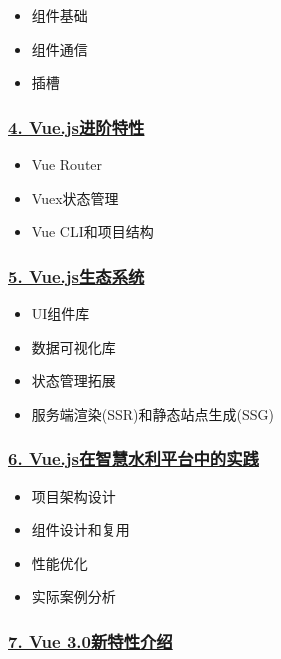 \begin{itemize}
\tightlist
\item
  组件基础
\item
  组件通信
\item
  插槽
\end{itemize}

\subsubsection{\texorpdfstring{\href{./section04-03-04.md}{4.
Vue.js进阶特性}}{4. Vue.js进阶特性}}\label{vue.jsux8fdbux9636ux7279ux6027}

\begin{itemize}
\tightlist
\item
  Vue Router
\item
  Vuex状态管理
\item
  Vue CLI和项目结构
\end{itemize}

\subsubsection{\texorpdfstring{\href{./section04-03-05.md}{5.
Vue.js生态系统}}{5. Vue.js生态系统}}\label{vue.jsux751fux6001ux7cfbux7edf}

\begin{itemize}
\tightlist
\item
  UI组件库
\item
  数据可视化库
\item
  状态管理拓展
\item
  服务端渲染(SSR)和静态站点生成(SSG)
\end{itemize}

\subsubsection{\texorpdfstring{\href{./section04-03-06.md}{6.
Vue.js在智慧水利平台中的实践}}{6. Vue.js在智慧水利平台中的实践}}\label{vue.jsux5728ux667aux6167ux6c34ux5229ux5e73ux53f0ux4e2dux7684ux5b9eux8df5}

\begin{itemize}
\tightlist
\item
  项目架构设计
\item
  组件设计和复用
\item
  性能优化
\item
  实际案例分析
\end{itemize}

\subsubsection{\texorpdfstring{\href{./section04-03-07.md}{7. Vue
3.0新特性介绍}}{7. Vue 3.0新特性介绍}}\label{vue-3.0ux65b0ux7279ux6027ux4ecbux7ecd}

